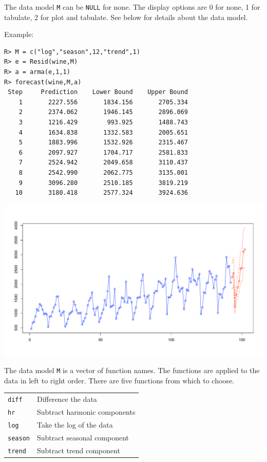 \documentclass[12pt]{article}
\begin{document}
\bigskip
\noindent
The data model {\tt M} can be {\tt NULL} for none.
The display options are 0 for none, 1 for tabulate,
2 for plot and tabulate.
See below for details about the data model.

\bigskip
\noindent
Example:

\begin{verbatim}
R> M = c("log","season",12,"trend",1)
R> e = Resid(wine,M)
R> a = arma(e,1,1)
R> forecast(wine,M,a)
 Step     Prediction    Lower Bound    Upper Bound
    1       2227.556       1834.156       2705.334
    2       2374.062       1946.145       2896.069
    3       1216.429        993.925       1488.743
    4       1634.838       1332.583       2005.651
    5       1883.996       1532.926       2315.467
    6       2097.927       1704.717       2581.833
    7       2524.942       2049.658       3110.437
    8       2542.990       2062.775       3135.001
    9       3096.280       2510.185       3819.219
   10       3180.418       2577.324       3924.636
\end{verbatim}

\begin{center}
\includegraphics[scale=0.3]{Rplot-34.pdf}
\end{center}

\noindent
The data model {\tt M} is a vector of function names.
The functions are applied to the data in left to right order.
There are five functions from which to choose.

\begin{center}
\begin{tabular}{ll}
{\tt diff} & Difference the data\\
{\tt hr} & Subtract harmonic components\\
{\tt log} & Take the log of the data\\
{\tt season} & Subtract seasonal component\\
{\tt trend} & Subtract trend component\\
\end{tabular}
\end{center}
\end{document}
